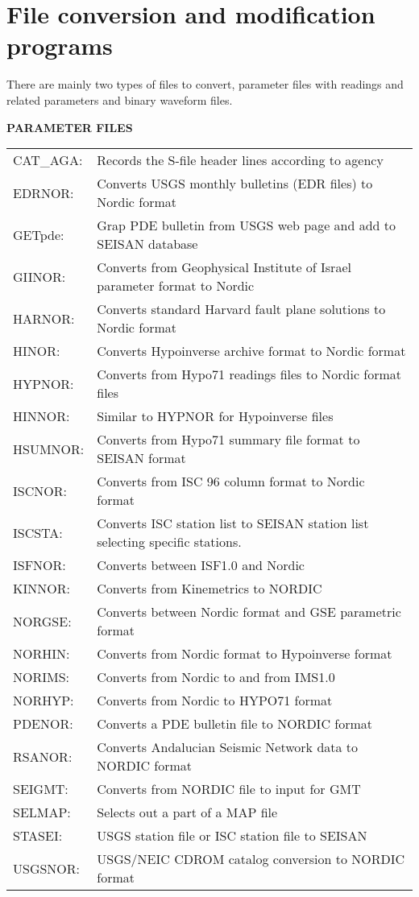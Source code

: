 
\section{File conversion and modification programs}
\label{sect:file-conversion}

 There are mainly two types of files to convert, parameter files with readings and related parameters and binary waveform files. 

\textbf{PARAMETER FILES}

\begin{tabular}{lp{10cm}}
CAT\_AGA: & Records the S-file header lines according to agency \\
EDRNOR: & Converts USGS monthly bulletins (EDR files) to Nordic format \\
GETpde: & Grap \index{GETPDE}PDE bulletin from USGS web page and add to SEISAN database\\
GIINOR: & Converts from Geophysical Institute of Israel\index{Israel} parameter format to Nordic \\
HARNOR: & Converts standard Harvard fault plane solutions to Nordic format \\
HINOR: & Converts Hypoinverse archive format to Nordic format \\
HYPNOR: & Converts from Hypo71 readings files to Nordic format files \\
HINNOR: & Similar to HYPNOR for Hypoinverse files \\
HSUMNOR: & Converts from Hypo71 summary file format to SEISAN format \\
ISCNOR: & Converts from ISC 96 column format to Nordic format \\
ISCSTA: & Converts ISC station list to SEISAN station list selecting specific stations. \\
ISFNOR: & Converts between ISF1.0 and Nordic \\
KINNOR: & Converts from Kinemetrics to NORDIC \\
NORGSE: & Converts between Nordic format and GSE parametric format \\
NORHIN: & Converts from Nordic format to Hypoinverse format \\
NORIMS: & Converts from  Nordic to and from IMS1.0 \\
NORHYP: & Converts from Nordic to HYPO71 format \\
PDENOR: & Converts a \index{PDE bulletin file}PDE bulletin file to NORDIC format \\
RSANOR: & Converts Andalucian Seismic Network data to NORDIC format\index{Andalucia} \\
SEIGMT: & Converts from NORDIC file to input for GMT \\
SELMAP: & Selects out a part of a MAP file \\
STASEI: & USGS station file or ISC station file to SEISAN \\
USGSNOR: & USGS/NEIC CDROM catalog conversion to NORDIC format\\
\end{tabular}
 

